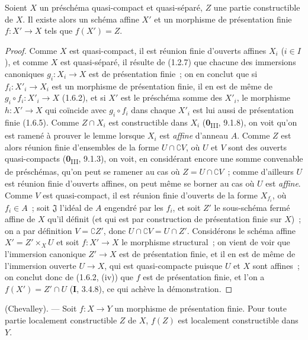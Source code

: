 \begin{lemma}[1.8.3]
\label{IV.1.8.3-fr}
Soient $X$ un préschéma quasi-compact et quasi-séparé, $Z$ une partie
constructible de $X$. Il existe alors un schéma affine $X'$ et un morphisme
de présentation finie $f:X'\to X$ tels que $f(X')=Z$.
\end{lemma}

\begin{proof}
Comme $X$ est quasi-compact, il est réunion finie d'ouverts affines $X_i$
($i\in I$), et comme $X$ est quasi-séparé, il résulte de (1.2.7) que chacune
des immersions canoniques $g_i:X_i\to X$ est de présentation finie~; on en
conclut que si $f_i:X'_i\to X_i$ est un morphisme de présentation finie, il
en est de même de $g_i\circ f_i:X'_i\to X$ (1.6.2), et si $X'$ est le
préschéma somme des $X'_i$, le morphisme $h:X'\to X$ qui coïncide avec
$g_i\circ f_i$ dans chaque $X'_i$ est lui aussi de présentation finie
(1.6.5). Comme $Z\cap X_i$ est constructible dans $X_i$
(\textbf{0}\textsubscript{III}, 9.1.8), on voit qu'on est ramené à prouver le lemme
lorsque $X_i$ est \emph{affine} d'anneau $A$. Comme $Z$ est alors réunion
finie d'ensembles de la forme $U\cap\complement V$, où $U$ et $V$ sont des
ouverts quasi-compacts (\textbf{0}\textsubscript{III}, 9.1.3), on voit, en considérant
encore une somme convenable de préschémas, qu'on peut se ramener au cas où
$Z=U\cap\complement V$~; comme d'ailleurs $U$ est réunion finie d'ouverts
affines, on peut même se borner au cas où $U$ est \emph{affine}. Comme $V$
est quasi-compact, il est réunion finie d'ouverts de la forme $X_{f_i}$, où
$f_i\in A$~; soit $\mathfrak J$ l'idéal de $A$ engendré par les $f_i$, et
soit $Z'$ le sous-schéma fermé affine de $X$ qu'il définit (et qui est par
construction de présentation finie sur $X$)~; on a par définition
$V=\complement Z'$, donc $U\cap\complement V=U\cap Z'$. Considérons le
schéma affine $X'=Z'\times_XU$
et soit $f:X'\to X$ le morphisme structural~; on vient de voir que
l'immersion canonique $Z'\to X$ est de présentation finie, et il en est de
même de l'immersion ouverte $U\to X$, qui est quasi-compacte puisque $U$ et
$X$ sont affines~; on conclut donc de (1.6.2, (iv)) que $f$ est de
présentation finie, et l'on a $f(X')=Z'\cap U$ (\textbf{I}, 3.4.8), ce qui achève la
démonstration.
\end{proof}

\begin{theorem}[1.8.4]
\label{IV.1.8.4-fr}
\textup{(Chevalley).} --- Soit $f:X\to Y$ un morphisme de présentation
finie. Pour toute partie localement constructible $Z$ de $X$, $f(Z)$ est
localement constructible dans $Y$.
\end{theorem}

